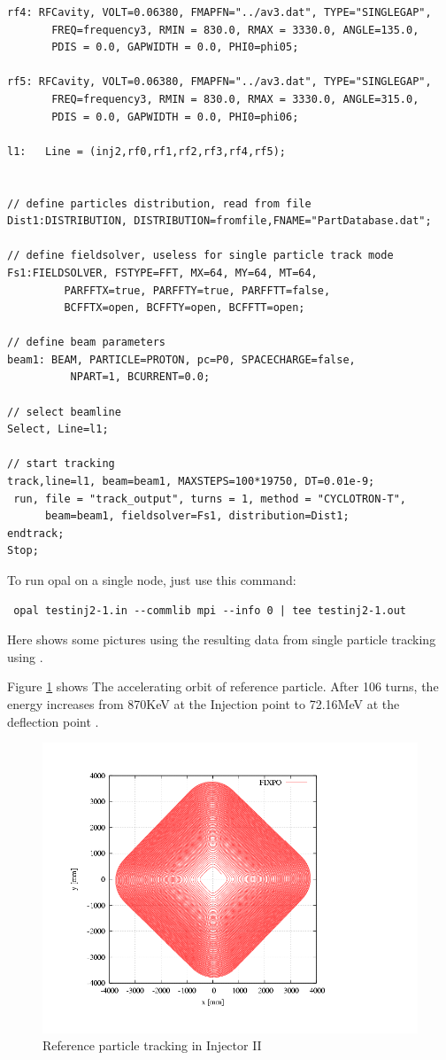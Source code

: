 {\begin{verbatim}
rf4: RFCavity, VOLT=0.06380, FMAPFN="../av3.dat", TYPE="SINGLEGAP", 
       FREQ=frequency3, RMIN = 830.0, RMAX = 3330.0, ANGLE=135.0,
       PDIS = 0.0, GAPWIDTH = 0.0, PHI0=phi05; 

rf5: RFCavity, VOLT=0.06380, FMAPFN="../av3.dat", TYPE="SINGLEGAP", 
       FREQ=frequency3, RMIN = 830.0, RMAX = 3330.0, ANGLE=315.0, 
       PDIS = 0.0, GAPWIDTH = 0.0, PHI0=phi06; 

l1:   Line = (inj2,rf0,rf1,rf2,rf3,rf4,rf5);


// define particles distribution, read from file
Dist1:DISTRIBUTION, DISTRIBUTION=fromfile,FNAME="PartDatabase.dat"; 

// define fieldsolver, useless for single particle track mode 
Fs1:FIELDSOLVER, FSTYPE=FFT, MX=64, MY=64, MT=64, 
		 PARFFTX=true, PARFFTY=true, PARFFTT=false,
		 BCFFTX=open, BCFFTY=open, BCFFTT=open;
		 
// define beam parameters
beam1: BEAM, PARTICLE=PROTON, pc=P0, SPACECHARGE=false, 
	      NPART=1, BCURRENT=0.0;

// select beamline
Select, Line=l1;

// start tracking
track,line=l1, beam=beam1, MAXSTEPS=100*19750, DT=0.01e-9;
 run, file = "track_output", turns = 1, method = "CYCLOTRON-T",
      beam=beam1, fieldsolver=Fs1, distribution=Dist1;
endtrack;
Stop;

\end{verbatim}
}
To run opal on a single node, just use this command:
{ \footnotesize 
\begin{verbatim}
 opal testinj2-1.in --commlib mpi --info 0 | tee testinj2-1.out
\end{verbatim}
}
Here shows some pictures using the resulting data from single particle tracking using \opalcycl.

Figure \ref{fig:reftrack} shows The accelerating orbit of reference particle. After 106 turns, the energy increases from 870KeV at
the Injection point to 72.16MeV at the deflection point . 
\begin{figure}[ht]
 \begin{center} 
   \includegraphics[width=0.8\linewidth,angle=0]{figures/cyclotron/AEO_Injector2.png}
   \caption{Reference particle tracking in Injector II}
   \label{fig:reftrack}
 \end{center}
\end{figure}

